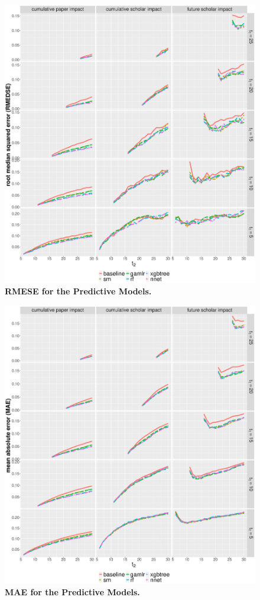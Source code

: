 \begin{refsection}
\begin{figure}[ht!]
    \centering
    \includegraphics[width=\textwidth]{figures/pred_model/medse.eps}
    \caption{{\bf RMESE for the Predictive Models.}}
    \label{fig:pred_medse}
\end{figure}

\begin{figure}[ht!]
    \centering
    \includegraphics[width=\textwidth]{figures/pred_model/mae.eps}
    \caption{{\bf MAE for the Predictive Models.}}
    \label{fig:pred_mae}
\end{figure}


\end{refsection}

